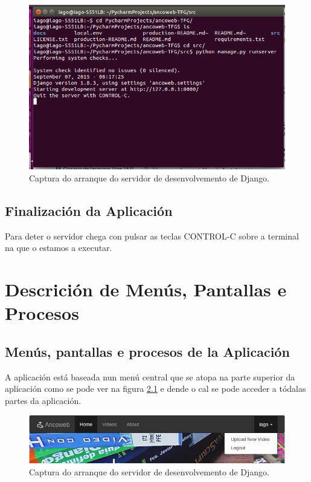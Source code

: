 \documentclass[11pt, a4paper, twoside, titlepage]{book}
\begin{document}
        \begin{figure}[htp]
        \begin{center}
            \includegraphics[scale=0.45]{figures/Arranque.png}
            \caption{Captura do arranque do servidor de desenvolvemento de Django.}
        \label{fig:Arranque}
        \end{center}
        \end{figure}
        
    \section{Finalización da Aplicación}
        Para deter o servidor chega con pulsar as teclas CONTROL-C sobre a terminal na que o estamos
        a executar. 

\chapter{Descrición de Menús, Pantallas e Procesos}
    \section{Menús, pantallas e procesos de la Aplicación}
        A aplicación está baseada nun menú central que se atopa na parte superior da aplicación como
        se pode ver na figura \ref{fig:menu} e dende o cal se pode acceder a tódalas partes da
        aplicación.
        
    \begin{figure}[htp]
    \begin{center}
        \includegraphics[scale=0.6]{figures/menu.png}
        \caption{Captura do arranque do servidor de desenvolvemento de Django.}
    \label{fig:menu}
    \end{center}
    \end{figure}
        
\end{document}
